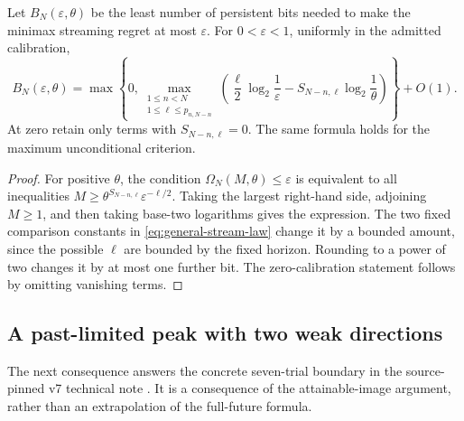 \begin{corollary}\label{cor:general-bit-profile}
Let $B_N(\varepsilon,\theta)$ be the least number of persistent bits
needed to make the minimax streaming regret at most $\varepsilon$.
For $0<\varepsilon<1$, uniformly in the admitted calibration,
\begin{equation}\label{eq:general-bit-profile}
 B_N(\varepsilon,\theta)=
 \max\left\{0,\max_{\substack{1\le n<N\\1\le\ell\le p_{n,N-n}}}
 \left(\frac\ell2\log_2\frac1\varepsilon
       -S_{N-n,\ell}\log_2\frac1\theta\right)\right\}+O(1).
\end{equation}
At zero retain only terms with $S_{N-n,\ell}=0$. The same formula
holds for the maximum unconditional criterion.
\end{corollary}
\begin{proof}
For positive $\theta$, the condition
$\Omega_N(M,\theta)\le\varepsilon$ is equivalent to all inequalities
$M\ge\theta^{S_{N-n,\ell}}\varepsilon^{-\ell/2}$.
Taking the largest right-hand side, adjoining $M\ge1$, and then taking
base-two logarithms gives the expression. The two fixed comparison
constants in \eqref{eq:general-stream-law} change it by a bounded
amount, since the possible $\ell$ are bounded by the fixed horizon.
Rounding to a power of two changes it by at most one further bit.
The zero-calibration statement follows by omitting vanishing terms.
\end{proof}

\subsection{A past-limited peak with two weak directions}
The next consequence answers the concrete seven-trial boundary in the
source-pinned v7 technical note \cite{A1v7note}. It is a consequence
of the attainable-image argument, rather than an extrapolation of the
full-future formula.

